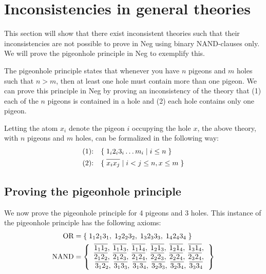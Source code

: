 
\section{Inconsistencies in general theories}
\label{sec:Inconsistencies in general theories}
This section will show that there exist inconsistent theories such that their inconsistencies are not possible to prove in Neg using binary NAND-clauses only.
We will prove the pigeonhole principle in Neg to exemplify this.

The pigeonhole principle states that whenever you have $n$ pigeons and $m$ holes such that $n > m$, then at least one hole must contain more than one pigeon.
We can prove this principle in Neg by proving an inconsistency of the theory that (1) each of the $n$ pigeons is contained in a hole and (2) each hole contains only one pigeon.

Letting the atom $x_i$ denote the pigeon $i$ occupying the hole $x$, the above theory, with $n$ pigeons and $m$ holes, can be formalized in the following way:
\begin{align}
  \text{(1):}\quad &\{ \; 1_i2_i3_i\dots m_i \;|\; i \leq n \; \}\\
  \text{(2):}\quad &\{ \; \ol{x_ix_j} \;|\; i < j \leq n, x \leq m \; \}
\end{align}
\subsection{Proving the pigeonhole principle}
\label{sub:Proving the pigeonhole principle}
We now prove the pigeonhole principle for 4 pigeons and 3 holes.
This instance of the pigeonhole principle has the following axioms:
\begin{align}
  \begin{split}
    \text{OR} &= \{ \; 1_12_13_1,\; 1_22_23_2,\; 1_32_33_3,\; 1_42_43_4 \; \}\\
    \text{NAND} &= \left \{
    \begin{tabular}{c}
      $\ol{1_11_2},\;\ol{1_11_3},\;\ol{1_11_4},\;\ol{1_21_3},\;\ol{1_21_4},\;\ol{1_31_4},$\\
      $\ol{2_12_2},\;\ol{2_12_3},\;\ol{2_12_4},\;\ol{2_22_3},\;\ol{2_22_4},\;\ol{2_32_4},$\\
      $\ol{3_12_2},\;\ol{3_13_3},\;\ol{3_13_4},\;\ol{3_23_3},\;\ol{3_23_4},\;\ol{3_33_4}$
    \end{tabular}
    \right \}
  \end{split}
  \label{eq:ax_pigeon}
\end{align}

